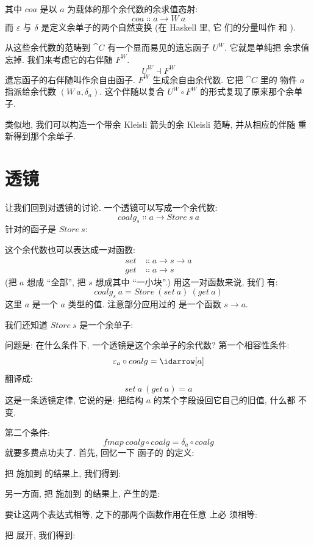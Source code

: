 \noindent
其中 $coa$ 是以 $a$ 为载体的那个余代数的余求值态射:
\[coa \Colon a \to W\ a\]
而 $\varepsilon$ 与 $\delta$ 是定义余单子的两个自然变换 (在 Haskell 里, 它
们的分量叫作  和 ).

从这些余代数的范畴到 $\cat{C}$ 有一个显而易见的遗忘函子 $U^W$. 它就是单纯把
余求值忘掉. 我们来考虑它的右伴随 $F^W$.
\[U^W \dashv F^W\]
遗忘函子的右伴随叫作余自由函子. $F^W$ 生成余自由余代数. 它把 $\cat{C}$ 里的
物件 $a$ 指派给余代数 $(W\ a, \delta_a)$. 这个伴随以复合
$U^W \circ F^W$ 的形式复现了原来那个余单子.

类似地, 我们可以构造一个带余 Kleisli 箭头的余 Kleisli 范畴, 并从相应的伴随
重新得到那个余单子.

\section{透镜}

让我们回到对透镜的讨论. 一个透镜可以写成一个余代数:
\[coalg_s \Colon a \to Store\ s\ a\]
针对的函子是 $Store\ s$:

这个余代数也可以表达成一对函数:
\begin{align*}
  set & \Colon a \to s \to a \\
  get & \Colon a \to s
\end{align*}
(把 $a$ 想成 ``全部'', 把 $s$ 想成其中 ``一小块''.) 用这一对函数来说, 我们
有:
\[coalg_s\ a = Store\ (set\ a)\ (get\ a)\]
这里 $a$ 是一个 $a$ 类型的值. 注意部分应用过的  是一个函数
$s \to a$.

我们还知道 $Store\ s$ 是一个余单子:

问题是: 在什么条件下, 一个透镜是这个余单子的余代数? 第一个相容性条件:
\[\varepsilon_a \circ coalg = \idarrow[a]\]
翻译成:
\[set\ a\ (get\ a) = a\]
这是一条透镜定律, 它说的是: 把结构 $a$ 的某个字段设回它自己的旧值, 什么都
不变.

第二个条件:
\[fmap\ coalg \circ coalg = \delta_a \circ coalg\]
就要多费点功夫了. 首先, 回忆一下  函子的  的定义:

把  施加到  的结果上, 我们得到:

另一方面, 把  施加到  的结果上, 产生的是:

要让这两个表达式相等,  之下的那两个函数作用在任意  上必
须相等:

把  展开, 我们得到:

